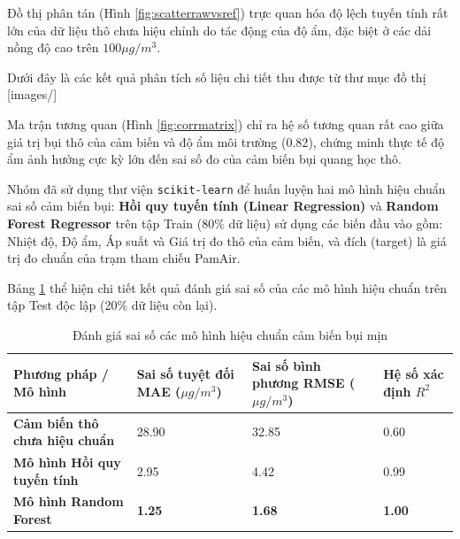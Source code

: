 Đồ thị phân tán (Hình \ref{fig:scatterrawvsref}) trực quan hóa độ lệch tuyến tính rất lớn của dữ liệu thô chưa hiệu chỉnh do tác động của độ ẩm, đặc biệt ở các dải nồng độ cao trên $100 \mu g/m^3$.

Dưới đây là các kết quả phân tích số liệu chi tiết thu được từ thư mục đồ thị [images/]

Ma trận tương quan (Hình \ref{fig:corrmatrix}) chỉ ra hệ số tương quan rất cao giữa giá trị bụi thô của cảm biến và độ ẩm môi trường ($0.82$), chứng minh thực tế độ ẩm ảnh hưởng cực kỳ lớn đến sai số đo của cảm biến bụi quang học thô.

Nhóm đã sử dụng thư viện \texttt{scikit-learn} để huấn luyện hai mô hình hiệu chuẩn sai số cảm biến bụi: \textbf{Hồi quy tuyến tính (Linear Regression)} và \textbf{Random Forest Regressor} trên tập Train (80\% dữ liệu) sử dụng các biến đầu vào gồm: Nhiệt độ, Độ ẩm, Áp suất và Giá trị đo thô của cảm biến, và đích (target) là giá trị đo chuẩn của trạm tham chiếu PamAir. 

Bảng \ref{tab:mlperformance} thể hiện chi tiết kết quả đánh giá sai số của các mô hình hiệu chuẩn trên tập Test độc lập (20\% dữ liệu còn lại).

\begin{table}[H]
\centering
\caption{Đánh giá sai số các mô hình hiệu chuẩn cảm biến bụi mịn}
\label{tab:mlperformance}
\small
\renewcommand{\arraystretch}{1.35}
\setlength{\tabcolsep}{5pt}

\begin{tabularx}{\textwidth}{|p{4.0cm}|X|X|X|}
\hline
\textbf{Phương pháp / Mô hình} 
& \textbf{Sai số tuyệt đối MAE ($\mu g/m^3$)} 
& \textbf{Sai số bình phương RMSE ($\mu g/m^3$)} 
& \textbf{Hệ số xác định $R^2$} \\
\hline

\textbf{Cảm biến thô chưa hiệu chuẩn} 
& 28.90 
& 32.85 
& 0.60 \\
\hline

\textbf{Mô hình Hồi quy tuyến tính} 
& 2.95 
& 4.42 
& 0.99 \\
\hline

\textbf{Mô hình Random Forest} 
& \textbf{1.25} 
& \textbf{1.68} 
& \textbf{1.00} \\
\hline

\end{tabularx}
\end{table}

